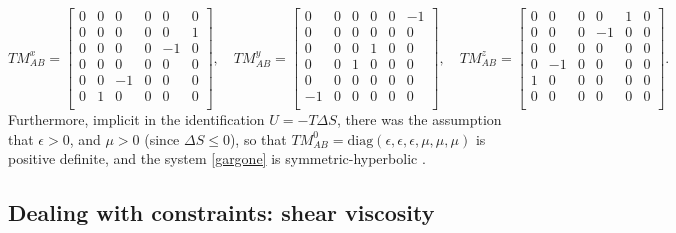 \documentclass[a4paper, amsfonts, amssymb, amsmath, reprint, showkeys, nofootinbib, twoside, onecolumn,notitlepage]{revtex4-1}
\begin{document}
\renewcommand{\arraystretch}{0.6}
\begin{equation}
TM^x_{AB}= 
\begin{bmatrix}
0 & 0 & 0 & 0 & 0 & 0  \\
0 & 0 & 0 & 0 & 0 & 1  \\
0 & 0 & 0 & 0 & -1 & 0  \\
0 & 0 & 0 & 0 & 0 & 0  \\
0 & 0 & -1 & 0 & 0 & 0  \\
0 & 1 & 0 & 0 & 0 & 0  \\
\end{bmatrix}  , \quad 
TM^y_{AB}= 
\begin{bmatrix}
0 & 0 & 0 & 0 & 0 & -1  \\
0 & 0 & 0 & 0 & 0 & 0  \\
0 & 0 & 0 & 1 & 0 & 0  \\
0 & 0 & 1 & 0 & 0 & 0  \\
0 & 0 & 0 & 0 & 0 & 0  \\
-1 & 0 & 0 & 0 & 0 & 0  \\
\end{bmatrix}  , \quad
TM^z_{AB}= 
\begin{bmatrix}
0 & 0 & 0 & 0 & 1 & 0  \\
0 & 0 & 0 & -1 & 0 & 0  \\
0 & 0 & 0 & 0 & 0 & 0  \\
0 & -1 & 0 & 0 & 0 & 0  \\
1 & 0 & 0 & 0 & 0 & 0  \\
0 & 0 & 0 & 0 & 0 & 0  \\
\end{bmatrix}  .
\end{equation}
Furthermore, implicit in the identification $U=-T\Delta S$, there was the assumption that $\epsilon>0$, and $\mu >0$ (since $\Delta S \leq 0$), so that $TM^0_{AB}=\text{diag}(\epsilon, \epsilon, \epsilon, \mu, \mu ,\mu)$ is positive definite, and the system \eqref{gargone} is symmetric-hyperbolic \cite{Volker2011}.

\subsection{Dealing with constraints: shear viscosity}
\end{document}
